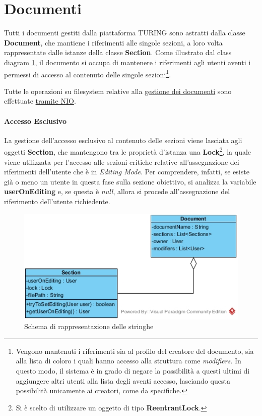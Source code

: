 \section{Documenti}
Tutti i documenti gestiti dalla piattaforma TURING sono astratti dalla classe \textbf{Document}, che mantiene i riferimenti alle singole sezioni, a loro volta rappresentate dalle istanze della classe \textbf{Section}. Come illustrato dal class diagram \ref{fig:document_class_diagram}, il documento si occupa di mantenere i riferimenti agli utenti aventi i permessi di accesso al contenuto delle singole sezioni\footnote{Vengono mantenuti i riferimenti sia al profilo del creatore del documento, sia alla lista di coloro i quali hanno accesso alla struttura come \textit{modifiers}. In questo modo, il sistema è in grado di negare la possibilità a questi ultimi di aggiungere altri utenti alla lista degli aventi accesso, lasciando questa possibilità unicamente ai creatori, come da specifiche.}.

Tutte le operazioni su filesystem relative alla \underline{gestione dei documenti} sono effettuate \underline{tramite NIO}.
\paragraph{Accesso Esclusivo}
La gestione dell'accesso esclusivo al contenuto delle sezioni viene lasciata agli oggetti \textbf{Section}, che mantengono tra le proprietà d'istanza una \textbf{Lock}\footnote{Si è scelto di utilizzare un oggetto di tipo \textbf{ReentrantLock}.}, la quale viene utilizzata per l'accesso alle sezioni critiche relative all'assegnazione dei riferimenti dell'utente che è in \textit{Editing Mode}. Per comprendere, infatti, se esiste già o meno un utente in questa fase sulla sezione obiettivo, si analizza la variabile \textbf{userOnEditing} e, se questa è \textit{null}, allora si procede all'assegnazione del riferimento dell'utente richiedente.

\begin{figure}[h]
	\caption{Schema di rappresentazione delle stringhe}
	\label{fig:document_class_diagram}
	\centering
	\includegraphics[scale=0.7]{assets/document_class_diagram.jpg}
\end{figure}

